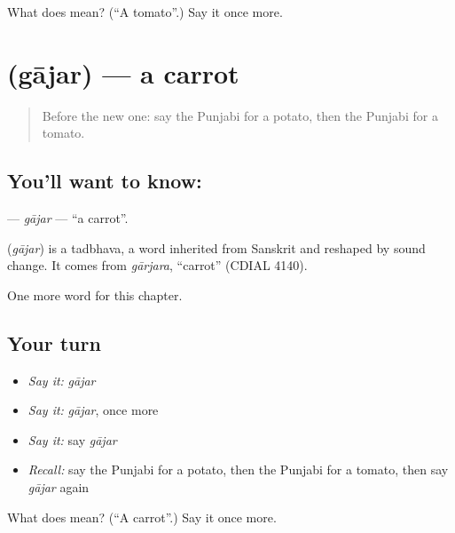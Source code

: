 \begin{tcolorbox}[breakable,colback=teal!4,colframe=teal!35!black,title={Before you move on}]
What does  mean? (\textquotedblleft{}A tomato\textquotedblright{}.) Say it once more.
\end{tcolorbox}
\section[\texorpdfstring{\pa{ਗਾਜਰ} (gājar)}{ਗਾਜਰ (gājar)}]{ (gājar) — a carrot}

\label{lesson:PA-C65-gajar}



\begin{quote}
Before the new one: say the Punjabi for a potato, then the Punjabi for a tomato.
\end{quote}

\subsection*{You'll want to know: }
\textbf{} — \emph{gājar} — \textquotedblleft{}a carrot\textquotedblright{}.

\begin{cousinweb}
\textbf{} (\emph{gājar}) is a tadbhava, a word inherited from Sanskrit and reshaped by sound change. It comes from \emph{gārjara}, \textquotedblleft{}carrot\textquotedblright{} (CDIAL 4140).
\end{cousinweb}

\begin{grammarlens}[title={What you've built}]
One more word for this chapter.
\end{grammarlens}

\subsection*{Your turn}
\begin{itemize}
\raggedright
  \item \emph{Say it:} \emph{gājar}
  \item \emph{Say it:} \emph{gājar}, once more
  \item \emph{Say it:} say \emph{gājar}
  \item \emph{Recall:} say the Punjabi for a potato, then the Punjabi for a tomato, then say \emph{gājar} again
\end{itemize}

\begin{tcolorbox}[breakable,colback=teal!4,colframe=teal!35!black,title={Before you move on}]
What does  mean? (\textquotedblleft{}A carrot\textquotedblright{}.) Say it once more.
\end{tcolorbox}
